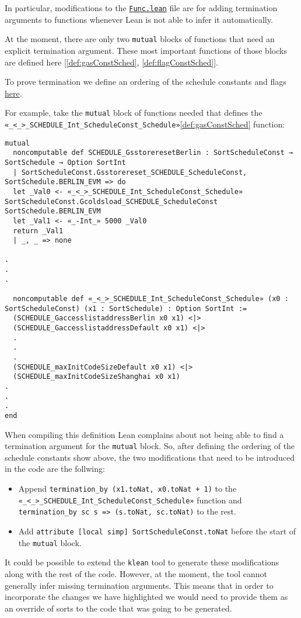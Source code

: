 In particular, modifications to the
\href{https://runtimeverification.github.io/evm-equivalence/docs/EvmEquivalence/KEVM2Lean/Func.html}{\texttt{Func.lean}}
file are for adding termination arguments to functions whenever Lean is not able
to infer it automatically.

At the moment, there are only two \texttt{mutual} blocks of functions that need
an explicit termination argument. These most important functions of those blocks
are defined here [\ref{def:gasConstSched}, \ref{def:flagConstSched}].

To prove termination we define an ordering of the schedule constants and flags
\href{https://runtimeverification.github.io/evm-equivalence/docs/EvmEquivalence/KEVM2Lean/ScheduleOrdering.html}{here}.

For example, take the \texttt{mutual} block of functions needed that defines the \texttt{«_<_>_SCHEDULE_Int_ScheduleConst_Schedule»}\ref{def:gasConstSched} function:

\begin{verbatim}
mutual
  noncomputable def SCHEDULE_GsstoreresetBerlin : SortScheduleConst → SortSchedule → Option SortInt
  | SortScheduleConst.Gsstorereset_SCHEDULE_ScheduleConst, SortSchedule.BERLIN_EVM => do
  let _Val0 <- «_<_>_SCHEDULE_Int_ScheduleConst_Schedule» SortScheduleConst.Gcoldsload_SCHEDULE_ScheduleConst SortSchedule.BERLIN_EVM
  let _Val1 <- «_-Int_» 5000 _Val0
  return _Val1
  | _, _ => none

.
.
.

  noncomputable def «_<_>_SCHEDULE_Int_ScheduleConst_Schedule» (x0 : SortScheduleConst) (x1 : SortSchedule) : Option SortInt :=
  (SCHEDULE_GaccesslistaddressBerlin x0 x1) <|>
  (SCHEDULE_GaccesslistaddressDefault x0 x1) <|>
  .
  .
  .
  (SCHEDULE_maxInitCodeSizeDefault x0 x1) <|>
  (SCHEDULE_maxInitCodeSizeShanghai x0 x1)
.
.
.
end
\end{verbatim}

When compiling this definition Lean complains about not being able to find a termination argument for the \texttt{mutual} block.
So, after defining the ordering of the schedule constants show above, the two modifications that need to be introduced in the code are the follwing:

\begin{itemize}
\item Append \texttt{termination_by (x1.toNat, x0.toNat + 1)} to the \texttt{«_<_>_SCHEDULE_Int_ScheduleConst_Schedule»} function and \texttt{termination_by sc s => (s.toNat, sc.toNat)} to the rest.
\item Add \texttt{attribute [local simp] SortScheduleConst.toNat} before the start of the \texttt{mutual} block.
\end{itemize}

It could be possible to extend the \texttt{klean} tool to generate these modifications along with the rest of the code. However, at the moment, the tool cannot generally infer missing termination arguments. This means that in order to incorporate the changes we have highlighted we would need to provide them as an override of sorts to the code that was going to be generated.
